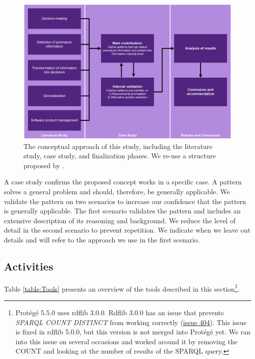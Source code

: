 \begin{figure}[H]
\centering
  \includegraphics[width=16cm]{../../Images/03_Methodology/03_METH_Phases.png}
  \caption{The conceptual approach of this study, including the literature study, case study, and finalization phases. We re-use a structure proposed by \cite{THE08}.}
  \label{fig:ds1}
\end{figure}

A case study confirms the proposed concept works in a specific case. A pattern solves a general problem and should, therefore, be generally applicable. We validate the pattern on two scenarios to increase our confidence that the pattern is generally applicable. The first scenario validates the pattern and includes an extensive description of its reasoning and background. We reduce the level of detail in the second scenario to prevent repetition. We indicate when we leave out details and will refer to the approach we use in the first scenario. 

\subsection{Activities} \label{activities}
Table \ref{table:Tools} presents an overview of the tools described in this section\footnote{Prot\'eg\'e 5.5.0 uses rdflib 3.0.0. Rdflib 3.0.0 has an issue that prevents \emph{SPARQL COUNT DISTINCT} from working correctly (\href{https://github.com/RDFLib/rdflib/issues/404}{issue 404}). This issue is fixed in rdflib 5.0.0, but this version is not merged into Prot\'eg\'e yet. We ran into this issue on several occasions and worked around it by removing the COUNT and looking at the number of results of the SPARQL query.}.

